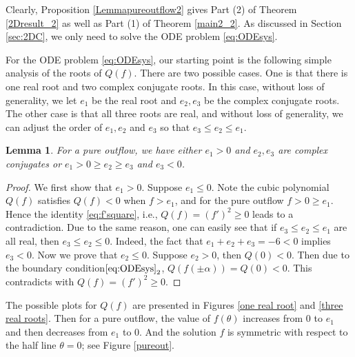 \documentclass[reqno,12pt]{amsart}
\newtheorem{lemma}[theorem]{Lemma}
\begin{document}
Clearly, Proposition \ref{Lemmapureoutflow2} gives Part (2) of Theorem \ref{2Dresult_2} as well as Part (1) of Theorem \ref{main2_2}.
 As discussed in Section \ref{sec:2DC}, we only need to solve the ODE problem \eqref{eq:ODEsys}. 
 
 For the ODE problem \eqref{eq:ODEsys},
our starting point is the following simple analysis of the roots of $Q(f)$. There are two possible cases. One is that there is one real root and two complex conjugate roots. In this case, without loss of generality, we let $e_1$ be the real root and $e_2, e_3 $ be the complex conjugate roots. 
The other case is that all three roots are real, and without loss of generality, we can adjust the order of $e_1, e_2$ and $e_3$ so that
$e_3 \leq e_2 \leq e_1$.

\begin{lemma}\label{lem:roots}
For a pure outflow, we have  either $e_1>0$ and $e_2, e_3 $ are complex conjugates or $e_1>0 \geq  e_2 \geq e_3$ and $e_3<0$. 
\end{lemma}
\begin{proof}
We first show that $e_1>0$.    Suppose $e_1 \leq 0$. Note the cubic polynomial $Q(f)$
satisfies  $Q(f) < 0$ when $f > e_1$, and for the pure outflow $f>0 \geq e_1$. Hence the identity \eqref{eq:f'square}, i.e., $Q(f)=(f')^2\geq 0$ leads to a contradiction. 
 Due to the same reason, one can easily see that if  $e_3 \leq e_2 \leq e_1$ are all real, then $e_3\leq e_2\leq0$.
 Indeed,  the fact that $e_1 + e_2 + e_3 =-6 <0$ implies $e_3 <0.$ Now we prove that $e_2\leq 0$.  Suppose $e_2 >0$, then $Q(0)<0$. Then due to the boundary condition${\eqref{eq:ODEsys}}_2$, $Q(f(\pm \alpha))=Q(0)<0$. This contradicts with $Q(f)=(f')^2\geq 0$. 
\end{proof}

The possible plots for $Q(f)$ are presented in Figures  \ref{one real root} and \ref{three real roots}.
{Then for a pure outflow, the value of $f(\theta)$ increases from $0$ to $e_1$ and then decreases from $e_1$ to $0$. And the solution $f$ is symmetric with respect to the half line $\theta=0$; see Figure \ref{pureout}.} 











\end{document}
